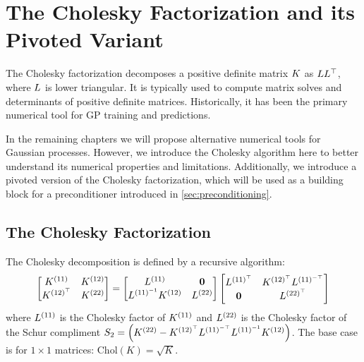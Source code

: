 \section{The Cholesky Factorization and its Pivoted Variant}

The Cholesky factorization decomposes a positive definite matrix $K$ as $L L^{\top}$, where $L$ is lower triangular.
It is typically used to compute matrix solves and determinants of positive definite matrices.
Historically, it has been the primary numerical tool for GP training and predictions.

In the remaining chapters we will propose alternative numerical tools for Gaussian processes.
However, we introduce the Cholesky algorithm here to better understand its numerical properties and limitations.
Additionally, we introduce a pivoted version of the Cholesky factorization, which will be used as a building block for a preconditioner introduced in \cref{sec:preconditioning}.

\subsection{The Cholesky Factorization}
%
The Cholesky decomposition is defined by a recursive algorithm:
%
\begin{equation}
 \label{eqn:cholesky_full}
 \begin{bmatrix} K^{(11)} & K^{(12)} \\ K^{(12)^\top} & K^{(22)}\end{bmatrix}
 =
 \begin{bmatrix} L^{(11)} & \mathbf{0} \\ L^{(11)^{-1}} K^{(12)} & L^{(22)}\end{bmatrix}
 \begin{bmatrix} L^{(11)^\top} & K^{(12)^\top} L^{(11)^{-\top}} \\ \mathbf{0} & L^{(22)^\top}\end{bmatrix}
\end{equation}
%
where $L^{(11)}$ is the Cholesky factor of $K^{(11)}$ and $L^{(22)}$ is the Cholesky factor of the Schur compliment $S_2 = \left( K^{(22)} - K^{(12)^\top} L^{(11)^{-\top}} L^{(11)^{-1}} K^{(12)} \right)$.
The base case is for $1 \times 1$ matrices: $\text{Chol}(K) = \sqrt{K}$.


